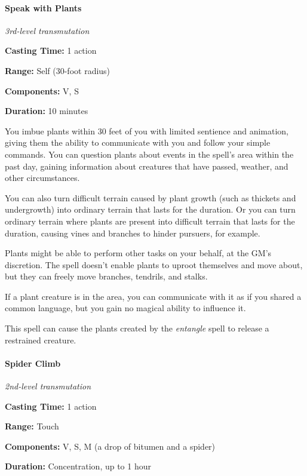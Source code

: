 \documentclass[
]{article}
\begin{document}
\hypertarget{speak-with-plants}{%
\paragraph{Speak with Plants}\label{speak-with-plants}}

\emph{3rd-level transmutation}

\textbf{Casting Time:} 1 action

\textbf{Range:} Self (30-foot radius)

\textbf{Components:} V, S

\textbf{Duration:} 10 minutes

You imbue plants within 30 feet of you with limited sentience and
animation, giving them the ability to communicate with you and follow
your simple commands. You can question plants about events in the
spell's area within the past day, gaining information about creatures
that have passed, weather, and other circumstances.

You can also turn difficult terrain caused by plant growth (such as
thickets and undergrowth) into ordinary terrain that lasts for the
duration. Or you can turn ordinary terrain where plants are present into
difficult terrain that lasts for the duration, causing vines and
branches to hinder pursuers, for example.

Plants might be able to perform other tasks on your behalf, at the GM's
discretion. The spell doesn't enable plants to uproot themselves and
move about, but they can freely move branches, tendrils, and stalks.

If a plant creature is in the area, you can communicate with it as if
you shared a common language, but you gain no magical ability to
influence it.

This spell can cause the plants created by the \emph{entangle} spell to
release a restrained creature.

\hypertarget{spider-climb}{%
\paragraph{Spider Climb}\label{spider-climb}}

\emph{2nd-level transmutation}

\textbf{Casting Time:} 1 action

\textbf{Range:} Touch

\textbf{Components:} V, S, M (a drop of bitumen and a spider)

\textbf{Duration:} Concentration, up to 1 hour
\end{document}
